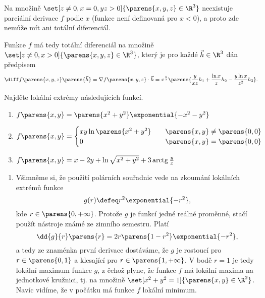 \documentclass[answers]{exam}
\begin{document}
\begin{questions}
\begin{solution}
\begin{enumerate}[label=(\roman*)]
			Na množině $\set[z \neq 0, x = 0, yz > 0]{\parens{x, y, z} \in \R^3}$ neexistuje parciální derivace $f$ podle $x$ (funkce není definovaná pro $x < 0$), a proto zde nemůže mít ani totální diferenciál.
			
			Funkce $f$ má tedy totální diferenciál na množině $\set[z \neq 0, x > 0]{\parens{x, y, z} \in \R^3}$, který je pro každé $\vec{h} \in \R^3$ dán předpisem
				\begin{equation*}
					\diff f \parens{x, y, z} \parens{\vec{h}}
					=
					\nabla f \parens{x,y,z} \cdot \vec{h}
					=
					x^{\frac{y}{z}}
					\parens{\frac{y}{xz} h_1 + \frac{\ln x}{z} h_2 - \frac{y \ln x}{z^2} h_3}.
				\end{equation*}
	\end{enumerate}
  \end{solution}
  
  \question
  Najděte lokální extrémy následujících funkcí.
	\begin{enumerate}[label=(\roman*)]
		\item $f\parens{x, y} = \parens{x^2 + y^2} \exponential{- x^2 - y^2}$
		\item $f\parens{x, y} = \begin{cases}
		xy \ln \parens{x^2 + y^2} \quad &\parens{x, y} \neq \parens{0, 0}
		\\
		0 \quad &\parens{x, y} = \parens{0, 0}
		\end{cases}$
		\item $f\parens{x, y} = x - 2y + \ln \sqrt{x^2 + y^2} + 3 \operatorname{arctg}\frac{y}{x}$
	\end{enumerate}
  
  \begin{solution}
		\begin{enumerate}[label=(\roman*)]
			\item 
				
				Všimněme si, že použití polárních souřadnic vede na zkoumání lokálních extrémů funkce
				\begin{equation*}
					g(r)
					\defeq
					r^2 \exponential{-r^2},
				\end{equation*}
				kde $r \in \parens{0, +\infty}$. Protože $g$ je funkcí jedné reálné proměnné, stačí použít nástroje známé ze zimního semestru. Platí
				\begin{equation*}
					\dd{g}{r}\parens{r}
					=
					2r \parens{1 - r^2} \exponential{-r^2},
				\end{equation*}
				a tedy ze znaménka první derivace dostáváme, že $g$ je rostoucí pro $r \in \parens{0, 1}$ a klesající pro $r \in \parens{1, +\infty}$. V bodě $r = 1$ je tedy lokální maximum funkce $g$, z čehož plyne, že funkce $f$ má lokální maxima na jednotkové kružnici, tj. na množině $\set[x^2 + y^2 = 1]{\parens{x, y} \in \R^2}$. Navíc vidíme, že v počátku má funkce $f$ lokální minimum.
			

\end{enumerate}
\end{solution}
\end{questions}
\end{document}
